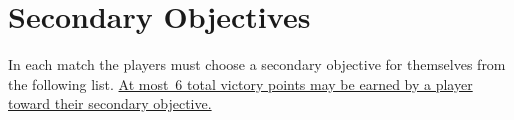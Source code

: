 \clearpage
\section{Secondary Objectives}

In each match the players must choose a secondary objective for
themselves from the following list.  \underline{At most~6 total
  victory points may be earned by a player toward their secondary
  objective.}

\begin{itemize}[leftmargin=2em]
\assassination

\chosenground

\controlthefield

\frontline

\hullbreaker

\interrogation

\meatgrinder

\seekanddestroy

\seizeground

\end{itemize}
